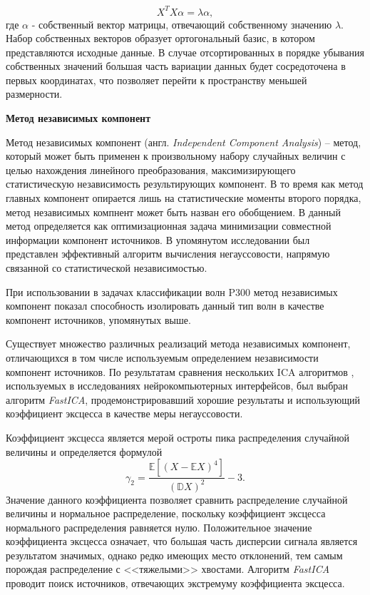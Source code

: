 \documentclass[12pt,fleqn]{article}
\begin{document}
$$X^TX \alpha = \lambda \alpha,$$
	где $\alpha$ - собственный вектор матрицы, отвечающий собственному значению $\lambda$. Набор собственных векторов образует ортогональный базис, в котором представляются исходные данные. В случае отсортированных в порядке убывания собственных значений большая часть вариации данных будет сосредоточена в первых координатах, что позволяет перейти к пространству меньшей размерности.
	\par {\bf Метод независимых компонент}
	\par Метод независимых компонент (англ. {\it Independent Component Analysis}) -- метод, который может быть применен к произвольному набору случайных величин с целью нахождения линейного преобразования, максимизирующего статистическую независимость результирующих компонент. В то время как метод главных компонент опирается лишь на статистические моменты второго порядка, метод независимых компнент может быть назван его обобщением. В \cite{Cachenoura} данный метод определяется как оптимизационная задача минимизации совместной информации компонент источников. В упомянутом исследовании был представлен эффективный алгоритм вычисления негауссовости, напрямую связанной со статистической независимостью.
	\par При использовании в задачах классификации волн P300 метод независимых компонент показал способность изолировать данный тип волн в качестве компонент источников, упомянутых выше.
	\par Существует множество различных реализаций метода независимых компонент, отличающихся в том числе используемым определением независимости компонент источников. По результатам сравнения нескольких ICA алгоритмов \cite{Cachenoura}, используемых  в исследованиях нейрокомпьютерных интерфейсов, был выбран алгоритм {\it FastICA}, продемонстрировавший хорошие результаты и использующий коэффициент эксцесса в качестве меры негауссовости.
	\par Коэффициент эксцесса является мерой остроты пика распределения случайной величины и  определяется формулой 
	$$\gamma_2 = \frac{\mathbb{E} [(X - \mathbb{E} X)^4]}{(\mathbb{D} X)^2} - 3.$$
	Значение данного коэффициента позволяет сравнить распределение случайной величины и нормальное распределение, поскольку коэффициент эксцесса нормального распределения равняется нулю. Положительное значение коэффициента эксцесса означает, что большая часть дисперсии сигнала является результатом значимых, однако редко имеющих место отклонений, тем самым порождая распределение с <<тяжелыми>> хвостами. Алгоритм {\it FastICA} проводит поиск источников, отвечающих экстремуму коэффициента эксцесса.
	
\end{document}
